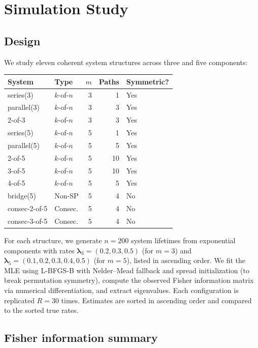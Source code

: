 \documentclass[12pt]{article}
\theoremstyle{definition}
\theoremstyle{remark}
\newcommand{\blam}{\boldsymbol{\lambda}}
\begin{document}
\section{Simulation Study}
\label{sec:simulations}

\subsection{Design}
\label{sec:sim-design}

We study eleven coherent system structures across three and five
components:

\begin{center}
\begin{tabular}{llrrl}
\toprule
System & Type & $m$ & Paths & Symmetric? \\
\midrule
series(3) & $k$-of-$n$ & 3 & 1 & Yes \\
parallel(3) & $k$-of-$n$ & 3 & 3 & Yes \\
2-of-3 & $k$-of-$n$ & 3 & 3 & Yes \\
series(5) & $k$-of-$n$ & 5 & 1 & Yes \\
parallel(5) & $k$-of-$n$ & 5 & 5 & Yes \\
2-of-5 & $k$-of-$n$ & 5 & 10 & Yes \\
3-of-5 & $k$-of-$n$ & 5 & 10 & Yes \\
4-of-5 & $k$-of-$n$ & 5 & 5 & Yes \\
bridge(5) & Non-SP & 5 & 4 & No \\
consec-2-of-5 & Consec. & 5 & 4 & No \\
consec-3-of-5 & Consec. & 5 & 4 & No \\
\bottomrule
\end{tabular}
\end{center}

For each structure, we generate $n = 200$ system lifetimes from
exponential components with rates
$\blam_3 = (0.2, 0.3, 0.5)$ (for $m = 3$) and
$\blam_5 = (0.1, 0.2, 0.3, 0.4, 0.5)$ (for $m = 5$), listed in
ascending order.  We fit the MLE using L-BFGS-B with Nelder--Mead
fallback and spread initialization (to break permutation symmetry),
compute the observed Fisher information matrix via numerical
differentiation, and extract eigenvalues.  Each configuration is
replicated $R = 30$ times.  Estimates are sorted in ascending order
and compared to the sorted true rates.

\subsection{Fisher information summary}
\label{sec:fisher-summary}
\end{document}
